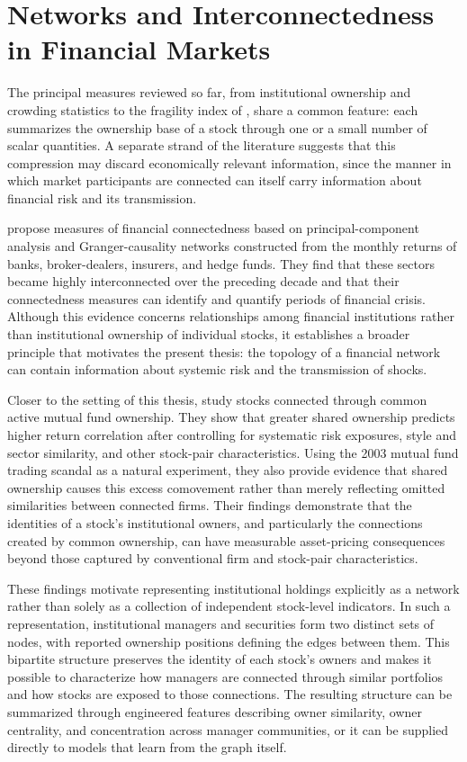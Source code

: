 \section{Networks and Interconnectedness in Financial Markets}
\label{sec:ownership_networks}

The principal measures reviewed so far, from institutional ownership and crowding statistics to the fragility index of \textcite{greenwood2011stock}, share a common feature: each summarizes the ownership base of a stock through one or a small number of scalar quantities. A separate strand of the literature suggests that this compression may discard economically relevant information, since the manner in which market participants are connected can itself carry information about financial risk and its transmission.

\textcite{billio2012econometric} propose measures of financial connectedness based on principal-component analysis and Granger-causality networks constructed from the monthly returns of banks, broker-dealers, insurers, and hedge funds. They find that these sectors became highly interconnected over the preceding decade and that their connectedness measures can identify and quantify periods of financial crisis. Although this evidence concerns relationships among financial institutions rather than institutional ownership of individual stocks, it establishes a broader principle that motivates the present thesis: the topology of a financial network can contain information about systemic risk and the transmission of shocks.

Closer to the setting of this thesis, \textcite{anton2014connected} study stocks connected through common active mutual fund ownership. They show that greater shared ownership predicts higher return correlation after controlling for systematic risk exposures, style and sector similarity, and other stock-pair characteristics. Using the 2003 mutual fund trading scandal as a natural experiment, they also provide evidence that shared ownership causes this excess comovement rather than merely reflecting omitted similarities between connected firms. Their findings demonstrate that the identities of a stock's institutional owners, and particularly the connections created by common ownership, can have measurable asset-pricing consequences beyond those captured by conventional firm and stock-pair characteristics.

These findings motivate representing institutional holdings explicitly as a network rather than solely as a collection of independent stock-level indicators. In such a representation, institutional managers and securities form two distinct sets of nodes, with reported ownership positions defining the edges between them. This bipartite structure preserves the identity of each stock's owners and makes it possible to characterize how managers are connected through similar portfolios and how stocks are exposed to those connections. The resulting structure can be summarized through engineered features describing owner similarity, owner centrality, and concentration across manager communities, or it can be supplied directly to models that learn from the graph itself.